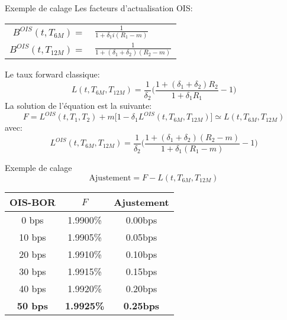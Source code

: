 \documentclass{beamer}
\begin{document}
\begin{frame}{Exemple de calage}
\small
Les facteurs d'actualisation OIS:
\begin{center}
\begin{tabular}{r l}
$B^{OIS}(t,T_{6M})=$ & $\frac{1}{1+\delta_1 i(R_1-m)}$ \\
$B^{OIS}(t,T_{12M})=$ & $\frac{1}{1+(\delta_1 + \delta_2) (R_2-m)}$ \\
\end{tabular}
\end{center}
Le taux forward classique:
\[
L(t,T_{6M},T_{12M})=\frac{1}{\delta_2}\big(\frac{1+(\delta_1+\delta_2) R_2}{1+\delta_1 R_1}-1\big)
\]
La solution de l'équation est la suivante:
\[
F=L^{OIS}(t,T_1,T_2)+m \big[ 1 - \delta_1 L^{OIS}(t,T_{6M},T_{12M}) \big] \simeq L(t,T_{6M},T_{12M})
\]
avec:
\[
L^{OIS}(t,T_{6M},T_{12M})=\frac{1}{\delta_2}\big(\frac{1+(\delta_1+\delta_2) (R_2-m)}{1+\delta_1 (R_1-m)}-1\big)
\]
\end{frame}

\begin{frame}{Exemple de calage}
\[
\text{Ajustement}=F-L(t,T_{6M},T_{12M})
\]
\begin{center}
\begin{tabular}{|c|c|c|}  
\hline  
OIS-BOR & $F$ & Ajustement \\ 
\hline  
0 bps & 1.9900\%&0.00bps\\ 
10 bps & 1.9905\%&0.05bps\\ 
20 bps & 1.9910\%&0.10bps\\ 
30 bps & 1.9915\%&0.15bps\\ 
40 bps & 1.9920\%&0.20bps\\ 
\textbf{\color{red}50 bps} & \textbf{\color{red}1.9925\%}&\textbf{\color{red}0.25bps}\\ 
\hline 
\end{tabular}
\end{center}
\end{frame}
\end{document}
